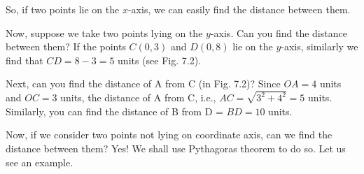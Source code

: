 \documentclass[11pt]{article}
\begin{document}
So, if two points lie on the \(x\)-axis, we can easily find the distance between them.

Now, suppose we take two points lying on the \(y\)-axis. Can you find the distance between them? If the points \(C(0, 3)\) and \(D(0, 8)\) lie on the \(y\)-axis, similarly we find that \(CD = 8 - 3 = 5\) units (see Fig. 7.2).

Next, can you find the distance of A from C (in Fig. 7.2)? Since \(OA = 4\) units and \(OC = 3\) units, the distance of A from C, i.e., \(AC = \sqrt{3^2 + 4^2} = 5\) units. Similarly, you can find the distance of B from D = \(BD = 10\) units.

Now, if we consider two points not lying on coordinate axis, can we find the distance between them? Yes! We shall use Pythagoras theorem to do so. Let us see an example.
\end{document}
